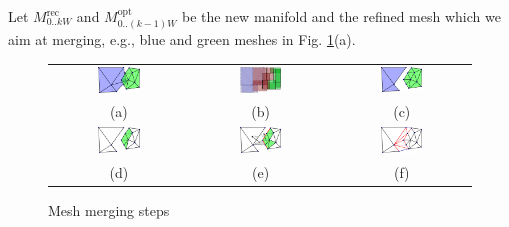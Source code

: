 Let $\mathit{M}_{0..kW}^{\text{rec}}$ and  $\mathit{M}_{0..(k-1)W}^{\text{opt}}$ be the new manifold and the refined mesh which we aim at merging, e.g., blue and green meshes in Fig. \ref{fig:mesh_merging}(a).


\begin{figure}[t]
\centering
\setlength{\tabcolsep}{1px}
\begin{tabular}{ccc}
\includegraphics[width=0.325\textwidth]{./img/ch-incr-dens/meshmerge01}&
\includegraphics[width=0.325\textwidth]{./img/ch-incr-dens/meshmerge03}&
\includegraphics[width=0.325\textwidth]{./img/ch-incr-dens/meshmerge04}\\
(a)&(b)&(c)\\
\includegraphics[width=0.325\textwidth]{./img/ch-incr-dens/meshmerge07}&
\includegraphics[width=0.325\textwidth]{./img/ch-incr-dens/meshmerge09}&
\includegraphics[width=0.325\textwidth]{./img/ch-incr-dens/meshmerge11}\\
(d)&(e)&(f)\\
\end{tabular}
\caption{Mesh merging steps}
\label{fig:mesh_merging}
\end{figure}
